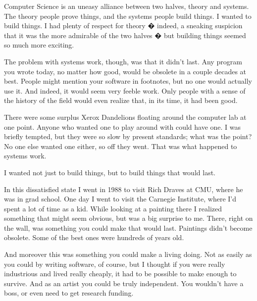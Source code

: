 Computer Science is an uneasy
                  alliance between two halves, theory and systems. The theory
                  people prove things, and the systems people build things. I
                  wanted to build things. I had plenty of respect for theory �
                  indeed, a sneaking suspicion that it was the more admirable of
                  the two halves � but building things seemed so much more
                  exciting.

The problem with systems work, though,
                  was that it didn't last. Any program you wrote today, no
                  matter how good, would be obsolete in a couple decades at
                  best. People might mention your software in footnotes, but no
                  one would actually use it. And indeed, it would seem very
                  feeble work. Only people with a sense of the history of the
                  field would even realize that, in its time, it had been
                  good.

There were some surplus Xerox Dandelions
                  floating around the computer lab at one point. Anyone who
                  wanted one to play around with could have one. I was briefly
                  tempted, but they were so slow by present standards; what was
                  the point? No one else wanted one either, so off they went.
                  That was what happened to systems work.

I wanted
                  not just to build things, but to build things that would
                  last.

In this dissatisfied state I went in 1988 to
                  visit Rich Draves at CMU, where he was in grad school. One day
                  I went to visit the Carnegie Institute, where I'd spent a lot
                  of time as a kid. While looking at a painting there I realized
                  something that might seem obvious, but was a big surprise to
                  me. There, right on the wall, was something you could make
                  that would last. Paintings didn't become obsolete. Some of the
                  best ones were hundreds of years old.

And moreover
                  this was something you could make a living doing. Not as
                  easily as you could by writing software, of course, but I
                  thought if you were really industrious and lived really
                  cheaply, it had to be possible to make enough to survive. And
                  as an artist you could be truly independent. You wouldn't have
                  a boss, or even need to get research funding.

